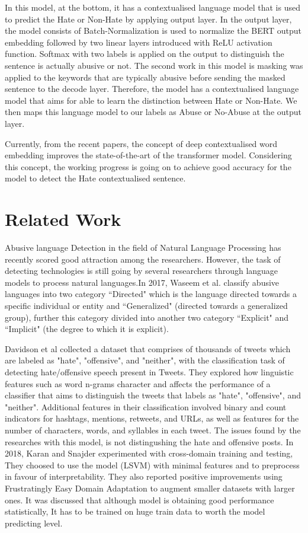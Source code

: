 \documentclass{article}
\begin{document}
In this model, at the bottom, it has a contextualised language model that is used to predict the Hate or Non-Hate  by applying output layer. In the output layer, the model consists of Batch-Normalization is used to normalize the BERT output embedding followed by two linear layers introduced with ReLU activation function. Softmax with two labels is applied on the output to distinguish the sentence is actually abusive or not. The second work in this model is masking was applied to the keywords that are typically abusive before sending the masked sentence to the decode layer. Therefore, the model has a contextualised language model\cite{kutuzov2021large} that aims for able to learn the distinction between Hate or Non-Hate. We then maps this language model to our labels as Abuse or No-Abuse at the output layer.

Currently, from the recent papers, the concept of deep contextualised word embedding improves the state-of-the-art of the transformer model. Considering this concept, the working progress is going on to achieve good accuracy for the model to detect the Hate contextualised sentence.

\section{Related Work}
Abusive language Detection in the field of Natural Language Processing has recently scored good attraction
among the researchers. However, the task of detecting technologies is still going by several researchers through language models to process natural languages.In 2017, Waseem et al.\cite{waseem-etal-2017-understanding} classify abusive languages into two category “Directed" which is the
language directed towards a specific individual or entity and “Generalized" (directed towards a generalized group), further this category divided into another two category “Explicit"
and “Implicit" (the degree to which it is explicit).


Davidson et al\citep{hateoffensive} collected a dataset that comprises of thousands of tweets which are labeled as "hate", "offensive", and "neither", with the classification task of detecting hate/offensive speech present
in Tweets. They explored how linguistic features such as  word n-grams character and affects the performance of a classifier that aims to distinguish the tweets that labels as "hate", "offensive", and "neither". Additional features in their classification involved binary and count
indicators for hashtags, mentions, retweets, and URLs, as well as features for the number of
characters, words, and syllables in each tweet. The issues found by the researches with this model, is not distingushing the hate and offensive posts.
In 2018, Karan and Snajder\cite{karan-snajder-2018-cross} experimented with
cross-domain training and testing, They choosed to use
the model (LSVM) with minimal features
and to preprocess in favour of interpretability.
They also reported positive improvements using
Frustratingly Easy Domain Adaptation\cite{DBLP:journals/corr/abs-0907-1815} to augment smaller datasets with
larger ones. It was discussed that although model is obtaining good performance statistically, It has to be trained on huge train data to worth the model predicting level.
\end{document}

